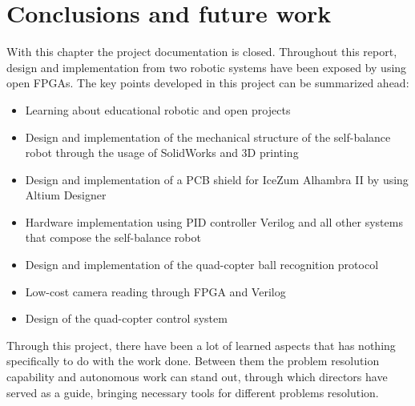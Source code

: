 \chapter{Conclusions and future work}\label{sec: Conclusiones}

With this chapter the project documentation is closed. Throughout this report, design and implementation from two robotic systems have been exposed by using open FPGAs.
The key points developed in this project can be summarized ahead:
\begin{itemize}
	\item Learning about educational robotic and open projects
	\item Design and implementation of the mechanical structure of the self-balance robot through the usage of SolidWorks and 3D printing
	\item Design and implementation of a PCB shield for IceZum Alhambra II by using Altium Designer
	\item Hardware implementation using PID controller Verilog and all other systems that compose the self-balance robot
	\item Design and implementation of the quad-copter ball recognition protocol
	\item Low-cost camera reading through FPGA and Verilog
	\item Design of the quad-copter control system
	
\end{itemize}

Through this project, there have been a lot of learned aspects that has nothing specifically to do with the work done. Between them the problem resolution capability and autonomous work can stand out, through which directors have served as a guide, bringing necessary tools for different problems resolution. \newline

